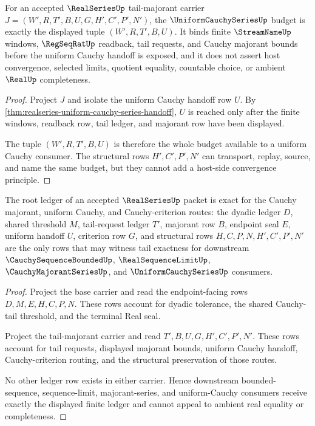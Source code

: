 \begin{theorem}
\label{thm:realseries-uniform-cauchy-budget}
For an accepted $\RealSeriesUp$ tail-majorant carrier $J=(W',R,T',B,U,G,H',C',P',N')$, the $\UniformCauchySeriesUp$ budget is exactly the displayed tuple $(W',R,T',B,U)$. It binds finite $\StreamNameUp$ windows, $\RegSeqRatUp$ readback, tail requests, and Cauchy majorant bounds before the uniform Cauchy handoff is exposed, and it does not assert host convergence, selected limits, quotient equality, countable choice, or ambient $\RealUp$ completeness.
\end{theorem}
\begin{proof}
Project $J$ and isolate the uniform Cauchy handoff row $U$. By \autoref{thm:realseries-uniform-cauchy-series-handoff}, $U$ is reached only after the finite windows, readback row, tail ledger, and majorant row have been displayed.

The tuple $(W',R,T',B,U)$ is therefore the whole budget available to a uniform Cauchy consumer. The structural rows $H',C',P',N'$ can transport, replay, source, and name the same budget, but they cannot add a host-side convergence principle.
\end{proof}

\begin{theorem}
\label{thm:realseries-root-ledger-exactness}
The root ledger of an accepted $\RealSeriesUp$ packet is exact for the Cauchy majorant, uniform Cauchy, and Cauchy-criterion routes: the dyadic ledger $D$, shared threshold $M$, tail-request ledger $T'$, majorant row $B$, endpoint seal $E$, uniform handoff $U$, criterion row $G$, and structural rows $H,C,P,N,H',C',P',N'$ are the only rows that may witness tail exactness for downstream $\CauchySequenceBoundedUp$, $\RealSequenceLimitUp$, $\CauchyMajorantSeriesUp$, and $\UniformCauchySeriesUp$ consumers.
\end{theorem}
\begin{proof}
Project the base carrier and read the endpoint-facing rows $D,M,E,H,C,P,N$. These rows account for dyadic tolerance, the shared Cauchy-tail threshold, and the terminal Real seal.

Project the tail-majorant carrier and read $T',B,U,G,H',C',P',N'$. These rows account for tail requests, displayed majorant bounds, uniform Cauchy handoff, Cauchy-criterion routing, and the structural preservation of those routes.

No other ledger row exists in either carrier. Hence downstream bounded-sequence, sequence-limit, majorant-series, and uniform-Cauchy consumers receive exactly the displayed finite ledger and cannot appeal to ambient real equality or completeness.
\end{proof}

